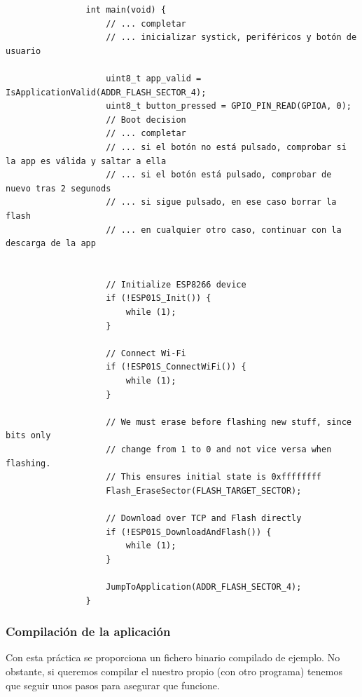 \documentclass[../main.tex]{subfiles}
\begin{document}
            \begin{lstlisting}
                int main(void) {
                    // ... completar 
                    // ... inicializar systick, periféricos y botón de usuario

                    uint8_t app_valid = IsApplicationValid(ADDR_FLASH_SECTOR_4);
                    uint8_t button_pressed = GPIO_PIN_READ(GPIOA, 0);
                    // Boot decision
                    // ... completar
                    // ... si el botón no está pulsado, comprobar si la app es válida y saltar a ella
                    // ... si el botón está pulsado, comprobar de nuevo tras 2 segunods
                    // ... si sigue pulsado, en ese caso borrar la flash
                    // ... en cualquier otro caso, continuar con la descarga de la app


                    // Initialize ESP8266 device
                    if (!ESP01S_Init()) {
                        while (1);
                    }

                    // Connect Wi-Fi
                    if (!ESP01S_ConnectWiFi()) {
                        while (1);
                    }

                    // We must erase before flashing new stuff, since bits only
                    // change from 1 to 0 and not vice versa when flashing.
                    // This ensures initial state is 0xffffffff
                    Flash_EraseSector(FLASH_TARGET_SECTOR);

                    // Download over TCP and Flash directly
                    if (!ESP01S_DownloadAndFlash()) {
                        while (1);    
                    }

                    JumpToApplication(ADDR_FLASH_SECTOR_4);
                }
            \end{lstlisting}


        \subsubsection{Compilación de la aplicación}

            Con esta práctica se proporciona un fichero binario compilado de ejemplo. No obstante, si queremos compilar el nuestro propio (con otro programa) tenemos que seguir unos pasos para asegurar que funcione.
\end{document}
